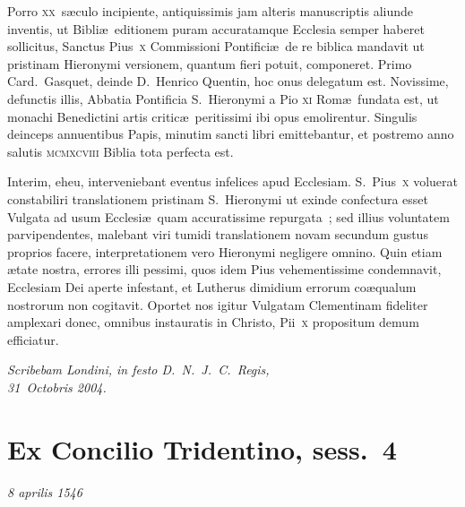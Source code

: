 Porro \textsc{xx}~s\ae culo incipiente, antiquissimis jam
alteris manuscriptis aliunde inventis, ut Bibli\ae\ editionem puram accuratamque
Ecclesia semper haberet sollicitus, Sanctus Pius~\textsc{x} Commissioni
Pontifici\ae\ de re biblica mandavit ut pristinam Hieronymi versionem, quantum
fieri potuit, componeret. Primo Card.~Gasquet, deinde D.~Henrico
Quentin, hoc onus delegatum est.  Novissime, defunctis illis, Abbatia Pontificia
S.~Hieronymi a Pio \textsc{xi} Rom\ae\ fundata est, ut monachi Benedictini
artis critic\ae\ peritissimi ibi opus emolirentur. Singulis deinceps annuentibus
Papis, minutim sancti libri emittebantur, et postremo anno salutis
\textsc{mcmxcviii} Biblia tota perfecta est.

Interim, eheu, interveniebant eventus infelices apud Ecclesiam. S.~Pius~\textsc{x}
voluerat constabiliri translationem pristinam S.~Hieronymi ut exinde confectura
esset Vulgata ad usum Ecclesi\ae\ quam accuratissime repurgata~; sed
illius voluntatem parvipendentes, malebant viri tumidi translationem
novam secundum gustus proprios facere, interpretationem vero Hieronymi negligere omnino. Quin etiam \ae tate nostra,
errores illi pessimi, quos idem Pius vehementissime condemnavit,
Ecclesiam Dei aperte infestant, et Lutherus dimidium errorum
co\ae qualum nostrorum non cogitavit. Oportet nos igitur Vulgatam Clementinam fideliter
amplexari donec, omnibus instauratis in Christo, Pii~\textsc{x} propositum
demum efficiatur.\enlargethispage{2\baselineskip}

\begin{flushright}
  \emph{Scribebam Londini, in festo D.~N.~J.~C.~Regis,\\ 31~Octobris 2004.}
\end{flushright}

\clearpage%
{\centering \section*{Ex Concilio Tridentino, sess.\ 4}}

\begin{center}
\vspace{-9pt}\textit{8 aprilis 1546}
\end{center}

